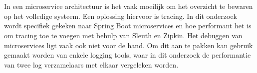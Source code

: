 




\chapter*{}

In een microservice architectuur is het vaak moeilijk om het overzicht te bewaren op het volledige systeem. Een oplossing hiervoor is tracing. In dit onderzoek wordt specifiek gekeken naar Spring Boot microservices en hoe performant het is om tracing toe te voegen met behulp van Sleuth en Zipkin. Het debuggen van microservices ligt vaak ook niet voor de hand. Om dit aan te pakken kan gebruik gemaakt worden van enkele logging tools, waar in dit onderzoek de performantie van twee log verzamelaars met elkaar vergeleken worden.

